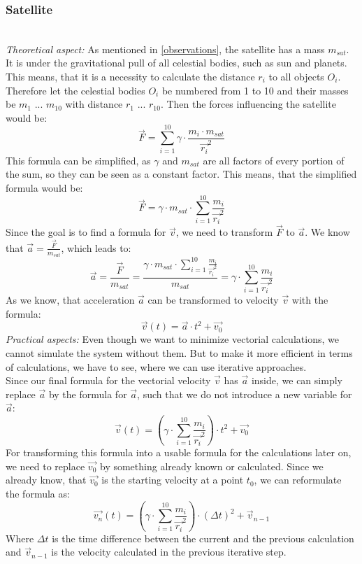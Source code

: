 \documentclass[conference,compsoc]{IEEEtran}
\begin{document}
\subsubsection{Satellite}\hfill\\
\emph{Theoretical aspect: } As mentioned in \ref{observations}, the satellite has a mass $m_{sat}$. It is under the gravitational pull of all celestial bodies, such as sun and planets. This means, that it is a necessity to calculate the distance $r_{i}$ to all objects $O_{i}$.
Therefore let the celestial bodies $O_{i}$ be numbered from 1 to 10 and their masses be $m_{1}$ ... $m_{10}$ with distance $r_{1}$ ... $r_{10}$. Then the forces influencing the satellite would be:
$$ \vec{F} = \sum_{i=1}^{10}{\gamma \cdot \frac{m_{i} \cdot m_{sat}}{\vec{r_{i}}^{2}}} $$
This formula can be simplified, as $\gamma$ and $m_{sat}$ are all factors of every portion of the sum, so they can be seen as a constant factor. This means, that the simplified formula would be:
$$ \vec{F} = \gamma \cdot m_{sat} \cdot \sum_{i=1}^{10}{\frac{m_{i}}{\vec{r_{i}}^{2}}} $$
Since the goal is to find a formula for $\vec{v}$, we need to transform $\vec{F}$ to $\vec{a}$. We know that $\vec{a} = \frac{\vec{F}}{m_{sat}}$, which leads to:
$$ \vec{a} = \frac{\vec{F}}{m_{sat}} = \frac{\gamma \cdot m_{sat} \cdot \sum_{i=1}^{10}{\frac{m_{i}}{\vec{r_{i}}^{2}}}}{m_{sat}} = \gamma \cdot \sum_{i=1}^{10}{\frac{m_{i}}{\vec{r_{i}}^{2}}} $$
As we know, that acceleration $\vec{a}$ can be transformed to velocity $\vec{v}$ with the formula: 
$$ \vec{v}(t) = \vec{a} \cdot t^{2} + \vec{v_{0}} $$
\emph{Practical aspects: } Even though we want to minimize vectorial calculations, we cannot simulate the system without them. But to make it more efficient in terms of calculations, we have to see, where we can use iterative approaches. \\ 
Since our final formula for the vectorial velocity $\vec{v}$ has $\vec{a}$ inside, we can simply replace $\vec{a}$ by the formula for $\vec{a}$, such that we do not introduce a new variable for $\vec{a}$:
$$ \vec{v}(t) = (\gamma \cdot \sum_{i=1}^{10}{\frac{m_{i}}{\vec{r_{i}}^{2}}}) \cdot t^{2} + \vec{v_{0}} $$
For transforming this formula into a usable formula for the calculations later on, we need to replace $\vec{v_{0}}$ by something already known or calculated. Since we already know, that $\vec{v_{0}}$ is the starting velocity at a point $t_{0}$, we can reformulate the formula as:
$$ \vec{v_{n}}(t) = (\gamma \cdot \sum_{i=1}^{10}{\frac{m_{i}}{\vec{r_{i}}^{2}}}) \cdot (\Delta t)^{2} + \vec{v}_{n-1} $$
Where $ \Delta t$ is the time difference between the current and the previous calculation and $\vec{v}_{n-1}$ is the velocity calculated in the previous iterative step.
\end{document}
